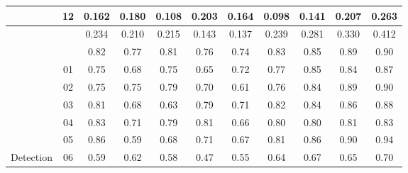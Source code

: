 \documentclass[runningheads]{llncs}
\begin{document}
\begin{table}[h!]
\begin{center}
\begin{tabular}{ccccccccccc}
		& 12 &\cellcolor{blue!30}0.162  &\cellcolor{blue!50}0.180  &\cellcolor{blue!10}0.108  &\cellcolor{blue!60}0.203  &\cellcolor{blue!40}0.164  &\cellcolor{blue!5}0.098  &\cellcolor{blue!20}0.141  &\cellcolor{blue!70}0.207 &\cellcolor{blue!80}\color{white}0.263\\
\midrule
&  &\cellcolor{blue!40}0.234 &\cellcolor{blue!20}0.210  &\cellcolor{blue!30}0.215  &\cellcolor{blue!10}0.143 &\cellcolor{blue!5}0.137 &\cellcolor{blue!50}0.239 &\cellcolor{blue!60}0.281 &\cellcolor{blue!70}0.330 &\cellcolor{blue!80}\color{white}0.412\\
\midrule
&  &\cellcolor{blue!40}0.82 &\cellcolor{blue!20}0.77 &\cellcolor{blue!30}0.81  &\cellcolor{blue!10}0.76 &\cellcolor{blue!5}0.74 &\cellcolor{blue!50}0.83 &\cellcolor{blue!60}0.85 &\cellcolor{blue!70}0.89 &\cellcolor{blue!80}\color{white}0.90\\
\midrule
        & 01 &\cellcolor{blue!40}0.75  &\cellcolor{blue!20}0.68  &\cellcolor{blue!40}0.75  &\cellcolor{blue!10}0.65  &\cellcolor{blue!30}0.72   &\cellcolor{blue!50}0.77   &\cellcolor{blue!70}0.85   &\cellcolor{blue!60}0.84 &\cellcolor{blue!80}\color{white}0.87 \\
        
		& 02 &\cellcolor{blue!20}0.75  &\cellcolor{blue!20}0.75  &\cellcolor{blue!50}0.79  &\cellcolor{blue!10}0.70  &\cellcolor{blue!5}0.61   &\cellcolor{blue!40}0.76  &\cellcolor{blue!60}0.84   &\cellcolor{blue!70}0.89 &\cellcolor{blue!80}\color{white}0.90 \\
		& 03  &\cellcolor{blue!40}0.81 &\cellcolor{blue!10}0.68  &\cellcolor{blue!5}0.63  &\cellcolor{blue!30}0.79  &\cellcolor{blue!20}0.71   &\cellcolor{blue!50}0.82   &\cellcolor{blue!60}0.84   &\cellcolor{blue!70}0.86&\cellcolor{blue!80}\color{white}0.88 \\
		
		& 04 &\cellcolor{blue!80}\color{white}0.83  &\cellcolor{blue!20}0.71  &\cellcolor{blue!30}0.79  &\cellcolor{blue!60}0.81  &\cellcolor{blue!10}0.66   &\cellcolor{blue!40}0.80   &\cellcolor{blue!40}0.80   &\cellcolor{blue!60}0.81 &\cellcolor{blue!80}\color{white}0.83 \\
		
		& 05 &\cellcolor{blue!60}0.86  &\cellcolor{blue!10}0.59  &\cellcolor{blue!30}0.68  &\cellcolor{blue!40}0.71  &\cellcolor{blue!20}0.67   &\cellcolor{blue!50}0.81   &\cellcolor{blue!60}0.86   &\cellcolor{blue!70}0.90 &\cellcolor{blue!80}\color{white}0.94 \\
		
		Detection& 06 &\cellcolor{blue!30}0.59  &\cellcolor{blue!40}0.62  &\cellcolor{blue!20}0.58  &\cellcolor{blue!5}0.47  &\cellcolor{blue!10}0.55   &\cellcolor{blue!50}0.64  &\cellcolor{blue!70}0.67   &\cellcolor{blue!60}0.65 &\cellcolor{blue!80}\color{white}0.70 \\
		

\end{tabular}
\end{center}
\end{table}
\end{document}
